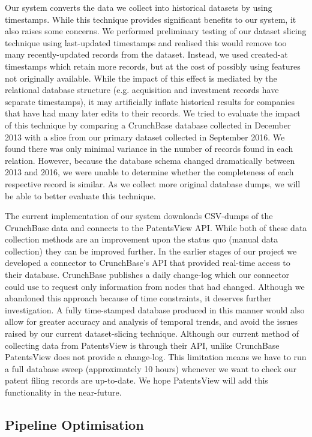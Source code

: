 \documentclass[../thesis/thesis.tex]{subfiles}
\begin{document}
Our system converts the data we collect into historical datasets by using timestamps. While this technique provides significant benefits to our system, it also raises some concerns. We performed preliminary testing of our dataset slicing technique using last-updated timestamps and realised this would remove too many recently-updated records from the dataset. Instead, we used created-at timestamps which retain more records, but at the cost of possibly using features not originally available. While the impact of this effect is mediated by the relational database structure (e.g. acquisition and investment records have separate timestamps), it may artificially inflate historical results for companies that have had many later edits to their records. We tried to evaluate the impact of this technique by comparing a CrunchBase database collected in December 2013 with a slice from our primary dataset collected in September 2016. We found there was only minimal variance in the number of records found in each relation. However, because the database schema changed dramatically between 2013 and 2016, we were unable to determine whether the completeness of each respective record is similar. As we collect more original database dumps, we will be able to better evaluate this technique.

The current implementation of our system downloads CSV-dumps of the CrunchBase data and connects to the PatentsView API. While both of these data collection methods are an improvement upon the status quo (manual data collection) they can be improved further. In the earlier stages of our project we developed a connector to CrunchBase's API that provided real-time access to their database. CrunchBase publishes a daily change-log which our connector could use to request only information from nodes that had changed. Although we abandoned this approach because of time constraints, it deserves further investigation. A fully time-stamped database produced in this manner would also allow for greater accuracy and analysis of temporal trends, and avoid the issues raised by our current dataset-slicing technique. Although our current method of collecting data from PatentsView is through their API, unlike CrunchBase PatentsView does not provide a change-log. This limitation means we have to run a full database sweep (approximately 10 hours) whenever we want to check our patent filing records are up-to-date. We hope PatentsView will add this functionality in the near-future.

\subsection{Pipeline Optimisation}
\end{document}
